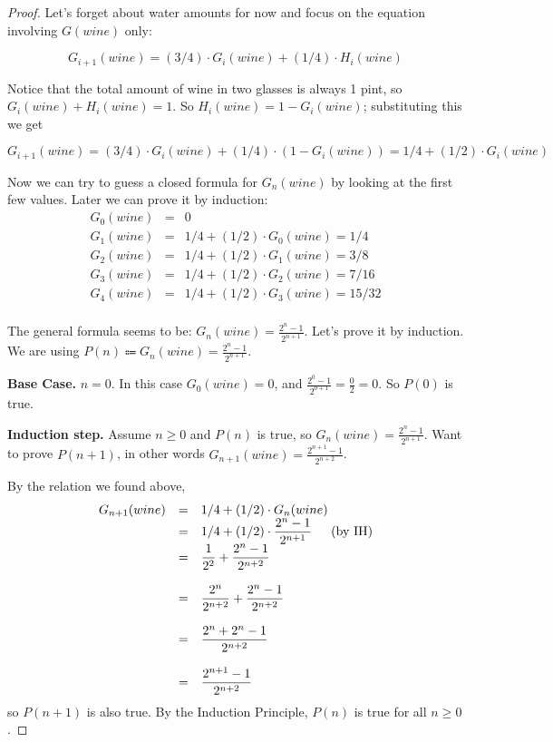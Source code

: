 \documentclass[14pt]{extarticle}
\newcommand{\dps}{\displaystyle}
\begin{document}
\begin{proof}
Let's forget about water amounts for now and focus on the equation involving $G(wine)$ only: 

$$
G_{i+1}(wine) = (3/4) \cdot G_i(wine) + (1/4) \cdot H_i(wine)
$$

Notice that the total amount of wine in two glasses is always 1 pint, so $G_i(wine) + H_i(wine) = 1$. So $H_i(wine) = 1 - G_i(wine)$; substituting this we get

$$
G_{i+1}(wine) = (3/4) \cdot G_i(wine) + (1/4) \cdot (1 - G_i(wine)) = 1/4 + (1/2)\cdot G_i(wine)
$$

Now we can try to guess a closed formula for $G_n(wine)$ by looking at the first few values. Later we can prove it by induction:
$$
\begin{array}{rcl}
G_0(wine) &=& 0 \\
G_1(wine) &=& 1/4 + (1/2)\cdot G_0(wine) = 1/4\\
G_2(wine) &=& 1/4 + (1/2)\cdot G_1(wine) = 3/8\\
G_3(wine) &=& 1/4 + (1/2)\cdot G_2(wine) = 7/16\\
G_4(wine) &=& 1/4 + (1/2)\cdot G_3(wine) = 15/32\\
\end{array}
$$

The general formula seems to be: $G_n(wine) = \dps \frac{2^n - 1}{2^{n+1}}$. Let's prove it by induction. We are using $P(n) \Coloneqq G_n(wine) = \dps \frac{2^n - 1}{2^{n+1}}$.

{\bf Base Case.} $n = 0$. In this case $G_0(wine) = 0$, and $\dps \frac{2^0 - 1}{2^{0+1}} = \frac{0}{2} = 0$. So $P(0)$ is true.


{\bf Induction step.} Assume $n \geq 0$ and $P(n)$ is true, so $G_n(wine) = \dps \frac{2^n - 1}{2^{n+1}}$. Want to prove $P(n+1)$, in other words $G_{n+1}(wine) = \dps \frac{2^{n+1} - 1}{2^{n+2}}$.

By the relation we found above,
\begin{displaymath}
\begin{array}{rcl}
G_{n+1}(wine) &=& 1/4 + (1/2) \cdot G_n(wine) \\
&=& \dps 1/4 + (1/2) \cdot \dps \frac{2^n - 1}{2^{n+1}} \text{\,\,\,\,\,\,\,\,\,(by IH)}\\
&=& \dps \frac{1}{2^2} + \frac{2^n - 1}{2^{n+2}} \\
&&\\
&=& \dps \frac{2^n}{2^{n+2}} + \frac{2^n - 1}{2^{n+2}} \\
&&\\
&=& \dps \frac{2^n + 2^n - 1}{2^{n+2}} \\
&&\\
&=& \dps \frac{2^{n+1} - 1}{2^{n+2}}
\end{array}
\end{displaymath}
so $P(n+1)$ is also true. By the Induction Principle, $P(n)$ is true for all $n \geq 0$.
\end{proof}
\end{document}
